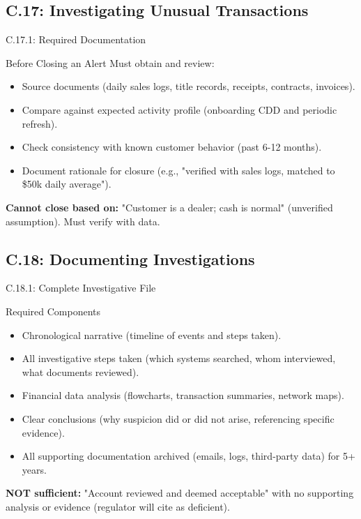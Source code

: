 \documentclass{beamer}
\begin{document}
	\subsection{C.17: Investigating Unusual Transactions}
	
	\begin{frame}{C.17.1: Required Documentation}
		\begin{block}{Before Closing an Alert}
			Must obtain and review:
			\begin{itemize}
				\item Source documents (daily sales logs, title records, receipts, contracts, invoices).
				\item Compare against expected activity profile (onboarding CDD and periodic refresh).
				\item Check consistency with known customer behavior (past 6-12 months).
				\item Document rationale for closure (e.g., "verified with sales logs, matched to \$50k daily average").
			\end{itemize}
		\end{block}
		\textbf{Cannot close based on:} "Customer is a dealer; cash is normal" (unverified assumption). Must verify with data.
	\end{frame}
	
	\subsection{C.18: Documenting Investigations}
	
	\begin{frame}{C.18.1: Complete Investigative File}
		\begin{block}{Required Components}
			\begin{itemize}
				\item Chronological narrative (timeline of events and steps taken).
				\item All investigative steps taken (which systems searched, whom interviewed, what documents reviewed).
				\item Financial data analysis (flowcharts, transaction summaries, network maps).
				\item Clear conclusions (why suspicion did or did not arise, referencing specific evidence).
				\item All supporting documentation archived (emails, logs, third-party data) for 5+ years.
			\end{itemize}
		\end{block}
		\textbf{NOT sufficient:} "Account reviewed and deemed acceptable" with no supporting analysis or evidence (regulator will cite as deficient).
	\end{frame}
	
\end{document}

